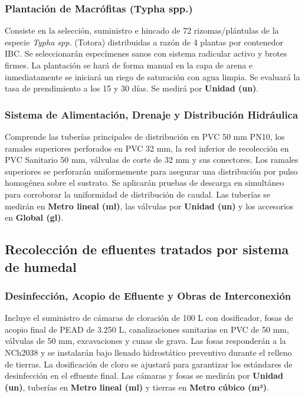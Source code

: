 \subsubsection*{Plantación de Macrófitas (Typha spp.)}

Consiste en la selección, suministro e hincado de 72 rizomas/plántulas de la especie \emph{Typha spp.} (Totora) distribuidas a razón de 4 plantas por contenedor IBC. Se seleccionarán especímenes sanos con sistema radicular activo y brotes firmes. La plantación se hará de forma manual en la capa de arena e inmediatamente se iniciará un riego de saturación con agua limpia. Se evaluará la tasa de prendimiento a los 15 y 30 días. Se medirá por \textbf{Unidad (un)}.

\subsubsection*{Sistema de Alimentación, Drenaje y Distribución Hidráulica}

Comprende las tuberías principales de distribución en PVC 50 mm PN10, los ramales superiores perforados en PVC 32 mm, la red inferior de recolección en PVC Sanitario 50 mm, válvulas de corte de 32 mm y sus conectores. Los ramales superiores se perforarán uniformemente para asegurar una distribución por pulso homogénea sobre el sustrato. Se aplicarán pruebas de descarga en simultáneo para corroborar la uniformidad de distribución de caudal. Las tuberías se medirán en \textbf{Metro lineal (ml)}, las válvulas por \textbf{Unidad (un)} y los accesorios en \textbf{Global (gl)}.

\subsection{Recolección de efluentes tratados por sistema de humedal}

\subsubsection*{Desinfección, Acopio de Efluente y Obras de Interconexión}

Incluye el suministro de cámaras de cloración de 100 L con dosificador, fosas de acopio final de PEAD de 3.250 L, canalizaciones sanitarias en PVC de 50 mm, válvulas de 50 mm, excavaciones y cunas de grava. Las fosas responderán a la NCh2038 y se instalarán bajo llenado hidrostático preventivo durante el relleno de tierras. La dosificación de cloro se ajustará para garantizar los estándares de desinfección en el efluente final. Las cámaras y fosas se medirán por \textbf{Unidad (un)}, tuberías en \textbf{Metro lineal (ml)} y tierras en \textbf{Metro cúbico (m³)}.

